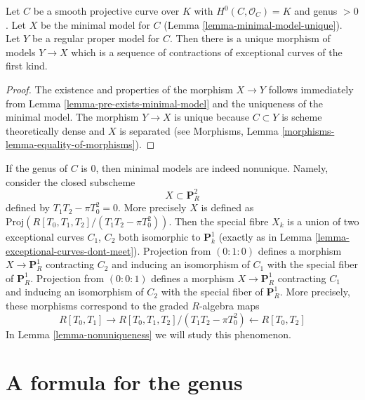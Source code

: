 \begin{lemma}
\label{lemma-minimal-model-mapping-property}
Let $C$ be a smooth projective curve over $K$ with $H^0(C, \mathcal{O}_C) = K$
and genus $> 0$. Let $X$ be the minimal model for $C$
(Lemma \ref{lemma-minimal-model-unique}).
Let $Y$ be a regular proper model for $C$. Then there is a unique
morphism of models $Y \to X$ which is a sequence of contractions of
exceptional curves of the first kind.
\end{lemma}

\begin{proof}
The existence and properties of the morphism $X \to Y$
follows immediately from Lemma \ref{lemma-pre-exists-minimal-model}
and the uniqueness of the minimal model.
The morphism $Y \to X$ is unique because
$C \subset Y$ is scheme theoretically dense and $X$ is separated
(see Morphisms, Lemma \ref{morphisms-lemma-equality-of-morphisms}).
\end{proof}

\begin{example}
\label{example-nonunique-in-genus-zero}
If the genus of $C$ is $0$, then minimal models are indeed nonunique.
Namely, consider the closed subscheme
$$
X \subset \mathbf{P}^2_R
$$
defined by $T_1T_2 - \pi T_0^2 = 0$. More precisely $X$ is defined
as $\text{Proj}(R[T_0, T_1, T_2]/(T_1T_2 - \pi T_0^2))$. Then the
special fibre $X_k$ is a union of two exceptional curves $C_1$, $C_2$ both
isomorphic to $\mathbf{P}^1_k$
(exactly as in Lemma \ref{lemma-exceptional-curves-dont-meet}).
Projection from $(0 : 1 : 0)$ defines a morphism $X \to \mathbf{P}^1_R$
contracting $C_2$ and inducing an isomorphism of $C_1$ with the special
fiber of $\mathbf{P}^1_R$. Projection from $(0 : 0 : 1)$ defines a
morphism $X \to \mathbf{P}^1_R$ contracting $C_1$ and inducing an
isomorphism of $C_2$ with the special fiber of $\mathbf{P}^1_R$.
More precisely, these morphisms correspond to the graded $R$-algebra
maps
$$
R[T_0, T_1] \longrightarrow
R[T_0, T_1, T_2]/(T_1T_2 - \pi T_0^2) \longleftarrow
R[T_0, T_2]
$$
In Lemma \ref{lemma-nonuniqueness} we will study this phenomenon.
\end{example}








\section{A formula for the genus}
\label{section-genus-formula}

